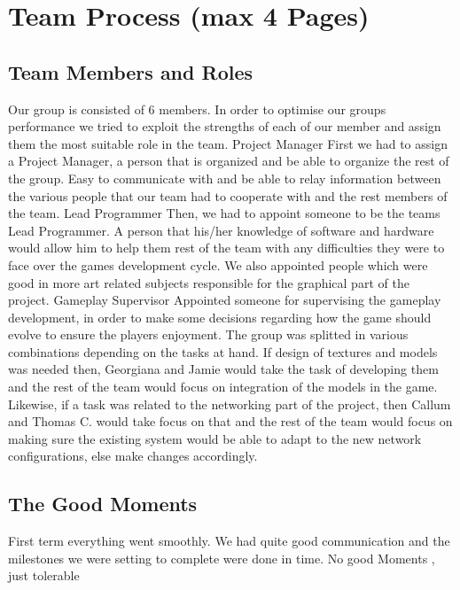 \documentclass[11pt,a4paper]{article}
\begin{document}
        \section{Team Process (max 4 Pages)}
        
        \subsection{Team Members and Roles}
        Our group is consisted of 6 members. In order to optimise our groups performance we tried to exploit the strengths of each of our member and assign them the most suitable role in the team. 
        Project Manager
        First we had to assign a Project Manager, a person that is organized and be able to organize the rest of the group. Easy to communicate with and be able to relay information between the various people that our team had to cooperate with and the rest members of the team. 
        Lead Programmer
        Then, we had to appoint someone to be the teams Lead Programmer. A person that his/her knowledge of software and hardware would allow him to help them rest of the team with any difficulties they were to face over the games development cycle. We also appointed people which were good in more art related subjects responsible for the graphical part of the project.
        Gameplay Supervisor
        Appointed someone for supervising the gameplay development, in order to make some decisions regarding how the game should evolve to ensure the players enjoyment. 
        The group was splitted in various combinations depending on the tasks at hand. If design of textures and models was needed then, Georgiana and Jamie would take the task of developing them and the rest of the team would focus on integration of the models in the game. Likewise, if a task was related to the networking part of the project, then Callum and Thomas C. would take focus on that and the rest of the team would focus on making sure the existing system would be able to adapt to the new network configurations, else make changes accordingly.
         
        \subsection{The Good Moments}
        First term everything went smoothly. We had quite good communication and the milestones we were setting to complete were done in time. No good Moments , just tolerable
\end{document}
